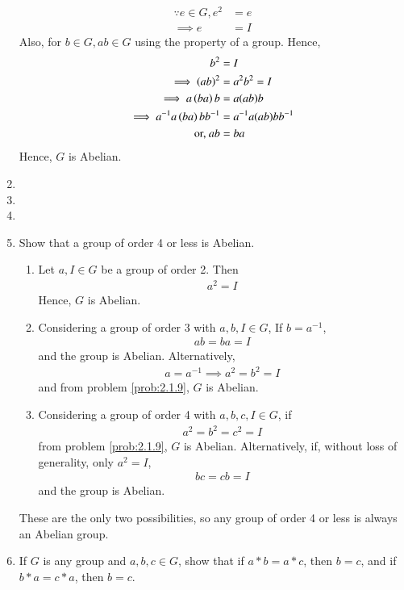 \begin{enumerate}[label=\arabic*.,ref=\thesubsection.\theenumi]
	\solution 
\begin{align}
	\because e \in G, e^2 &= e	
	\\
	\implies e &=I
\end{align}
Also, for $b \in G, ab \in G$ using the property of a group.  Hence, 
\begin{align}
 b^2 &= I
	\\
	\implies \left(ab\right)^2 &=a^2b^2=I
	\\
	\implies a\left(ba\right)b &= a(ab)b
	\\
	\implies a^{-1}a\left(ba\right)bb^{-1} &= a^{-1}a(ab)bb^{-1}
\\
	\text{or, } ab &=ba
\end{align}
Hence, $G$ is Abelian.
\item 
\item 
\item 
\item Show that a group of order 4 or less is Abelian.
	\\
	\solution 
	\begin{enumerate}
		\item Let $a,I \in G$ be a group of order 2. Then
			\begin{align}
				a^2 = I
			\end{align}
			Hence, $G$ is Abelian.
		\item Considering a group of order 3 with $a,b,I \in G$, 
			If $b = a^{-1}$,
			\begin{align}
				ab = ba = I
			\end{align}
			and the group is Abelian.  Alternatively, 
			\begin{align}
				a = a^{-1} \implies a^2 = b^2 = I
			\end{align}
			and from problem  
	\ref{prob:2.1.9}, $G$ is Abelian.
\item Considering a group of order 4 with $a, b, c, I \in G$, if 
			\begin{align}
				 a^2 = b^2 = c^2 = I
			\end{align}
			from problem  
	\ref{prob:2.1.9}, $G$ is Abelian. Alternatively, if, without loss of generality, only $a^2=I$, 
			\begin{align}
				 bc = cb = I
			\end{align}
			and the group is Abelian.  
	\end{enumerate}
These are the only two possibilities, so any group of order 4 or less is always an Abelian group.
\item
	If $G$ is any group and $a, b, c \in G$, show that if $a * b = a * c$, then $b = c$, and if $b * a = c * a$, then $b = c$.

\end{enumerate}
